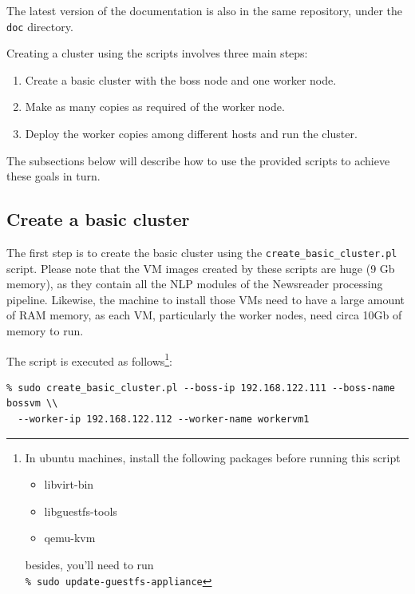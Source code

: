 \documentclass[a4]{article}
\begin{document}
The latest version of the documentation is also in the same repository,
under the \texttt{doc} directory.

Creating a cluster using the scripts involves three main steps:
\begin{enumerate}
\item Create a basic cluster with the boss node and one worker node.
\item Make as many copies as required of the worker node.
\item Deploy the worker copies among different hosts and run the cluster.
\end{enumerate}

The subsections below will describe how to use the provided scripts to
achieve these goals in turn.

\subsection{Create a basic cluster}
\label{sec:create-basic-cluster}

The first step is to create the basic cluster using the
\texttt{create\_basic\_cluster.pl} script. Please note that the VM images
created by these scripts are huge (9 Gb memory), as they contain all the NLP
modules of the Newsreader processing pipeline. Likewise, the machine to
install those VMs need to have a large amount of RAM memory, as each VM,
particularly the worker nodes, need circa 10Gb of memory to run.

The script is executed as follows\footnote{In ubuntu machines, install the
  following packages before running this script
  \begin{itemize}
  \item libvirt-bin
  \item libguestfs-tools
  \item qemu-kvm
  \end{itemize}
\noindent besides, you'll need to run\\
\texttt{\% sudo update-guestfs-appliance}
}:

\begin{verbatim}
% sudo create_basic_cluster.pl --boss-ip 192.168.122.111 --boss-name bossvm \\
  --worker-ip 192.168.122.112 --worker-name workervm1
\end{verbatim}
\end{document}
